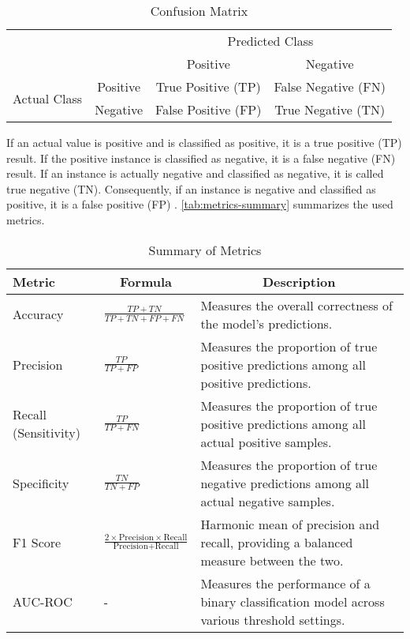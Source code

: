 \begin{table}[ht]
\caption{Confusion Matrix}
\label{tab:confusion-matrix}
\renewcommand{\arraystretch}{1.5}
\centering
\begin{tabular}{cc|c|c|}
\cline{3-4}
& & \multicolumn{2}{c|}{Predicted Class} \\ \cline{3-4} 
& & Positive & Negative \\ \hline
\multicolumn{1}{|c|}{\multirow{2}{*}{Actual Class}} & Positive & True Positive (TP) & False Negative (FN) \\ \cline{2-4} 
\multicolumn{1}{|c|}{} & Negative & False Positive (FP) & True Negative (TN) \\ \hline
\end{tabular}
\end{table}

If an actual value is positive and is classified as positive, it is a true positive (TP) result. If the positive instance is classified as negative, it is a false negative (FN) result. If an instance is actually negative and classified as negative, it is called true negative (TN). Consequently, if an instance is negative and classified as positive, it is a false positive (FP) \cite{Fawcett2006}. \autoref{tab:metrics-summary} summarizes the used metrics.
\begin{table}[ht]
\caption{Summary of Metrics}
\label{tab:metrics-summary}
\centering
\begin{tabular}{@{}p{3.5cm}p{4cm}p{5.5cm}@{}}
\toprule
\textbf{Metric} & \multicolumn{1}{c}{\textbf{Formula}} & \multicolumn{1}{c}{\textbf{Description}}\\ \midrule
Accuracy & \centering$\displaystyle\frac{TP + TN}{TP + TN + FP + FN}$ & Measures the overall correctness of the model's predictions.\\
Precision & \centering$\displaystyle\frac{TP}{TP + FP}$ & Measures the proportion of true positive predictions among all positive predictions.\\
Recall (Sensitivity) & \centering$\displaystyle\frac{TP}{TP + FN}$ & Measures the proportion of true positive predictions among all actual positive samples.\\
Specificity & \centering$\displaystyle\frac{TN}{TN + FP}$  & Measures the proportion of true negative predictions among all actual negative samples.\\
F1 Score & \centering$\displaystyle\frac{2 \times \text{Precision} \times \text{Recall}}{\text{Precision} + \text{Recall}}$  &  Harmonic mean of precision and recall, providing a balanced measure between the two.\\
AUC-ROC & \centering- & Measures the performance of a binary classification model across various threshold settings. \\
\bottomrule
\end{tabular}
\end{table}
